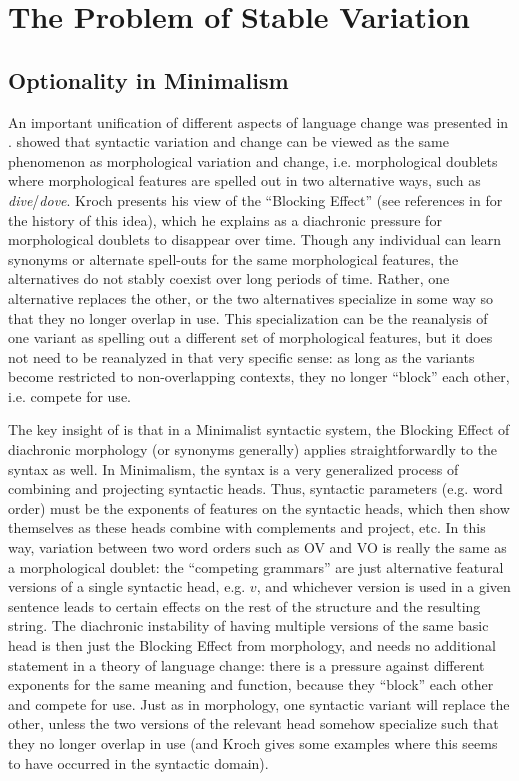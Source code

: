 \section{The Problem of Stable Variation}
\subsection{Optionality in Minimalism}

An important unification of different aspects of language change was presented in \citet{kroch1994}.
\citet{kroch1994} showed that syntactic variation and change can be viewed as the same phenomenon as morphological variation and change, i.e. morphological doublets where morphological features are spelled out in two alternative ways, such as \textsl{dive}/\textsl{dove}.
Kroch presents his view of the ``Blocking Effect'' (see references in \citealt{kroch1994} for the history of this idea), which he explains as a diachronic pressure for morphological doublets to disappear over time.
Though any individual can learn synonyms or alternate spell-outs for the same morphological features, the alternatives do not stably coexist over long periods of time.
Rather, one alternative replaces the other, or the two alternatives specialize in some way so that they no longer overlap in use.
This specialization can be the reanalysis of one variant as spelling out a different set of morphological features, but it does not need to be reanalyzed in that very specific sense: as long as the variants become restricted to non-overlapping contexts, they no longer ``block'' each other, i.e. compete for use.

The key insight of \citet{kroch1994} is that in a Minimalist syntactic system, the Blocking Effect of diachronic morphology (or synonyms generally) applies straightforwardly to the syntax as well.
In Minimalism, the syntax is a very generalized process of combining and projecting syntactic heads.
Thus, syntactic parameters (e.g. word order) must be the exponents of features on the syntactic heads, which then show themselves as these heads combine with complements and project, etc.
In this way, variation between two word orders such as OV and VO is really the same as a morphological doublet: the ``competing grammars'' \citep{kroch1989} are just alternative featural versions of a single syntactic head, e.g. $v$, and whichever version is used in a given sentence leads to certain effects on the rest of the structure and the resulting string.
The diachronic instability of having multiple versions of the same basic head is then just the Blocking Effect from morphology, and needs no additional statement in a theory of language change: there is a pressure against different exponents for the same meaning and function, because they ``block'' each other and compete for use.
Just as in morphology, one syntactic variant will replace the other, unless the two versions of the relevant head somehow specialize such that they no longer overlap in use (and Kroch gives some examples where this seems to have occurred in the syntactic domain).

